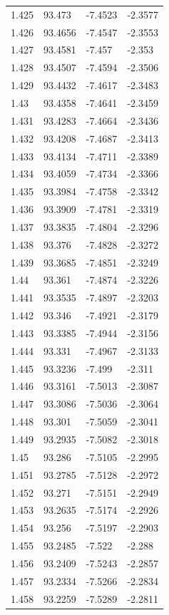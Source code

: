\begin{tabular}{llll}
1.425 & 93.473 & -7.4523 & -2.3577 \\
1.426 & 93.4656 & -7.4547 & -2.3553 \\
1.427 & 93.4581 & -7.457 & -2.353 \\
1.428 & 93.4507 & -7.4594 & -2.3506 \\
1.429 & 93.4432 & -7.4617 & -2.3483 \\
1.43 & 93.4358 & -7.4641 & -2.3459 \\
1.431 & 93.4283 & -7.4664 & -2.3436 \\
1.432 & 93.4208 & -7.4687 & -2.3413 \\
1.433 & 93.4134 & -7.4711 & -2.3389 \\
1.434 & 93.4059 & -7.4734 & -2.3366 \\
1.435 & 93.3984 & -7.4758 & -2.3342 \\
1.436 & 93.3909 & -7.4781 & -2.3319 \\
1.437 & 93.3835 & -7.4804 & -2.3296 \\
1.438 & 93.376 & -7.4828 & -2.3272 \\
1.439 & 93.3685 & -7.4851 & -2.3249 \\
1.44 & 93.361 & -7.4874 & -2.3226 \\
1.441 & 93.3535 & -7.4897 & -2.3203 \\
1.442 & 93.346 & -7.4921 & -2.3179 \\
1.443 & 93.3385 & -7.4944 & -2.3156 \\
1.444 & 93.331 & -7.4967 & -2.3133 \\
1.445 & 93.3236 & -7.499 & -2.311 \\
1.446 & 93.3161 & -7.5013 & -2.3087 \\
1.447 & 93.3086 & -7.5036 & -2.3064 \\
1.448 & 93.301 & -7.5059 & -2.3041 \\
1.449 & 93.2935 & -7.5082 & -2.3018 \\
1.45 & 93.286 & -7.5105 & -2.2995 \\
1.451 & 93.2785 & -7.5128 & -2.2972 \\
1.452 & 93.271 & -7.5151 & -2.2949 \\
1.453 & 93.2635 & -7.5174 & -2.2926 \\
1.454 & 93.256 & -7.5197 & -2.2903 \\
1.455 & 93.2485 & -7.522 & -2.288 \\
1.456 & 93.2409 & -7.5243 & -2.2857 \\
1.457 & 93.2334 & -7.5266 & -2.2834 \\
1.458 & 93.2259 & -7.5289 & -2.2811 \\

\end{tabular}
